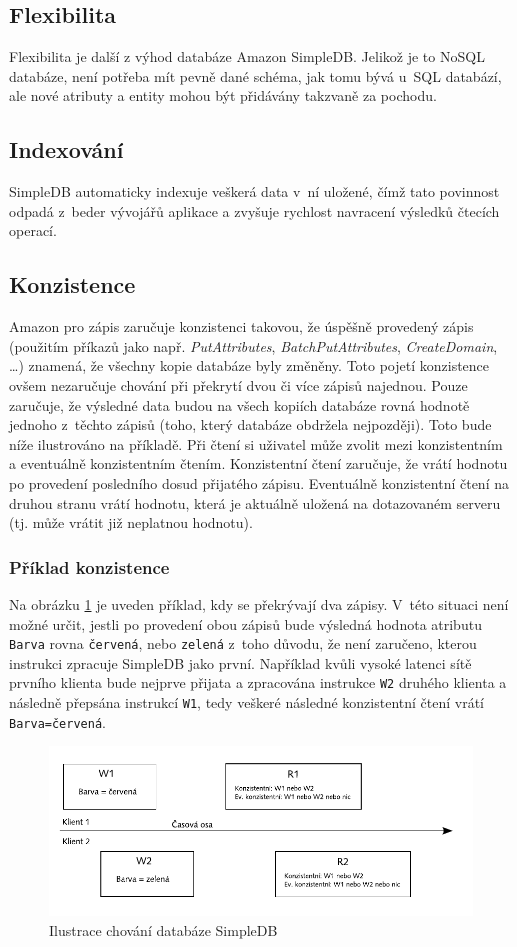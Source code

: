 \documentclass[oneside,12pt,final]{fithesis2}
\begin{document}
\subsection{Flexibilita}
Flexibilita je další z výhod databáze Amazon SimpleDB. Jelikož je to NoSQL databáze, není potřeba mít pevně dané schéma, jak tomu bývá u~SQL databází, ale nové atributy a entity mohou být přidávány takzvaně za pochodu.
\subsection{Indexování}
SimpleDB automaticky indexuje veškerá data v~ní uložené, čímž tato povinnost odpadá z~beder vývojářů aplikace a zvyšuje rychlost navracení výsledků čtecích operací.	
\subsection{Konzistence}
Amazon pro zápis zaručuje konzistenci takovou, že úspěšně provedený zápis (použitím příkazů jako např. \emph{PutAttributes}, \emph{BatchPutAttributes}, \emph{CreateDomain}, \dots) znamená, že všechny kopie databáze byly změněny. Toto pojetí konzistence ovšem nezaručuje chování při překrytí dvou či více zápisů najednou. Pouze zaručuje, že výsledné data budou na všech kopiích databáze rovná hodnotě jednoho z~těchto zápisů (toho, který databáze obdržela nejpozději). Toto bude níže ilustrováno na příkladě.
Při čtení si uživatel může zvolit mezi konzistentním a eventuálně konzistentním čtením. Konzistentní čtení zaručuje, že vrátí hodnotu po provedení posledního dosud přijatého zápisu. Eventuálně konzistentní čtení na druhou stranu vrátí hodnotu, která je aktuálně uložená na dotazovaném serveru (tj. může vrátit již neplatnou hodnotu).
\subsubsection*{Příklad konzistence}
Na obrázku \ref{consistencyExample} je uveden příklad, kdy se překrývají dva zápisy. V~této situaci není možné určit, jestli po provedení obou zápisů bude výsledná hodnota atributu \verb<Barva< rovna \verb<červená<, nebo \verb<zelená< z~toho důvodu, že není zaručeno, kterou instrukci zpracuje SimpleDB jako první. Například kvůli vysoké latenci sítě prvního klienta bude nejprve přijata a zpracována instrukce \verb<W2< druhého klienta a následně přepsána instrukcí \verb<W1<, tedy veškeré následné konzistentní čtení vrátí \verb<Barva=červená<.
\begin{figure}[h]
 \centering
 \includegraphics[scale=0.9]{ConsistencyExample}
 \caption{Ilustrace chování databáze SimpleDB}
 \label{consistencyExample}
\end{figure}
\end{document}
